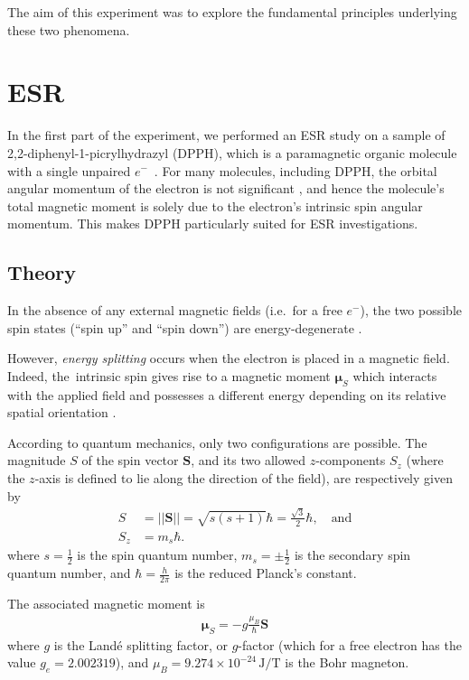 \documentclass[a4paper]{jpconf}
\numberwithin{equation}{section}
\begin{document}
The aim of this experiment was to explore the fundamental principles underlying these two phenomena.

\section{ESR}
In the first part of the experiment, we performed an ESR study on a sample of 2,2-diphenyl-1-picrylhydrazyl (DPPH), which is a paramagnetic organic molecule with a single unpaired $e^-$~\cite{MacLaren}. For many molecules, including DPPH, the orbital angular momentum of the electron is not significant \cite{MacLaren},
and hence the molecule\textquoteright s total magnetic moment is solely due to the electron\textquoteright s intrinsic spin angular momentum. This makes DPPH particularly suited for ESR investigations.
 
\subsection{Theory}\label{section: theory}
In the absence of any external magnetic fields (i.e.\ for a free $e^-$), the two possible spin states (``spin up'' and ``spin down'') are energy-degenerate \cite{Yadav}.

However, \emph{energy splitting} occurs when the electron is placed in a magnetic field. Indeed, the~intrinsic spin gives rise to a magnetic moment $\bm{\mu}_S$ which interacts with the applied field and possesses a different energy depending on its relative spatial orientation \cite{Yadav}. 

According to quantum mechanics, only two configurations are possible. The magnitude $S$ of the spin vector $\mathbf{S}$, and its two allowed $z$-components $S_z$ (where the $z$-axis is defined to lie along the direction of the field), are respectively given by
\begin{align}
	S &= \lvert\lvert\mathbf{S}\rvert\rvert = \sqrt{s(s+1)}\hbar = \tfrac{\sqrt{3}}{2}\hbar,  \quad \text{and} \nonumber \\
	S_z &= m_s \hbar. \label{eqn: magnetic moment z-projection}
\end{align}
where $s=\tfrac12$ is the spin quantum number, $m_s=\pm\tfrac12$ is the secondary spin quantum number, and $\hbar = \tfrac{h}{2 \pi}$ is the reduced Planck\textquoteright s constant.

The associated magnetic moment is
\begin{align}
	\bm{\mu}_S = - g \frac{\mu_B}{\hbar} \mathbf{S} \label{eqn: magnetic moment}
\end{align}
where $g$ is the Land\'e splitting factor, or $g$-factor (which for a free electron has the value $g_e = 2.002319$), and $\mu_B = 9.274 \times 10^{-24} \, \si{\joule\per\tesla}$ is the Bohr magneton. 
\end{document}
